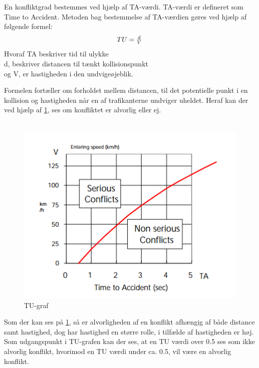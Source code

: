  En konfliktgrad bestemmes ved hjælp af TA-værdi. TA-værdi er defineret som Time to Accident. Metoden bag bestemmelse af TA-værdien gøres ved hjælp af følgende formel:
 \begin{equation}
  $$TU=\frac{d}{V} $$
\end{equation}
Hvoraf TA beskriver tid til ulykke \\ d, beskriver distancen til tænkt kollisionspunkt \\ og V, er hastigheden i den undvigeøjeblik.

Formelen fortæller om forholdet mellem distancen, til det potentielle punkt i en kollision og hastigheden når en af trafikanterne undviger uheldet. Heraf kan der ved hjælp af \cref{fig:tugraff}, ses om konfliktet er alvorlig eller ej.
~\\\\

\begin{figure}[htbp]
  \label{fig:tugraff}
  \centering
  \begin{adjustbox}{max width=\textwidth}
    \includegraphics{billederogfigur/tugraf.png} %
 \end{adjustbox}
  \caption{TU-graf}
\end{figure}

Som der kan ses på \cref{fig:tugraff}, så er alvorligheden af en konflikt afhængig af både distance samt hastighed, dog har hastighed en større rolle, i tilfælde af hastigheden er høj.
Som udgangspunkt i TU-grafen kan der ses, at en TU værdi over 0.5 ses som ikke alvorlig konflikt, hvorimod en TU værdi under ca. 0.5, vil være en alvorlig konflikt.




